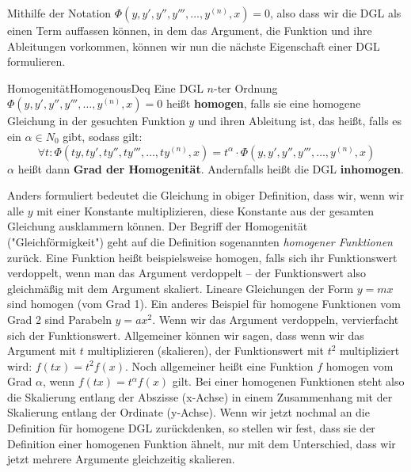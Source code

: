 Mithilfe der Notation $\Phi(y,y',y'',y''',\dots,y^{(n)},x) = 0$, also dass wir die DGL als einen Term auffassen können, in dem das Argument, die Funktion und ihre Ableitungen vorkommen, können wir nun die nächste Eigenschaft einer DGL formulieren.

\begin{definition}{Homogenität}{HomogenousDeq}
    Eine DGL $n$-ter Ordnung $\Phi(y,y',y'',y''',\dots,y^{(n)},x) = 0$ heißt \textbf{homogen}, falls sie eine homogene Gleichung in der gesuchten Funktion $y$ und ihren Ableitung ist, das heißt, falls es ein $\alpha\in N_0$ gibt, sodass gilt:
    $$
        \forall t: \Phi(ty,ty',ty'',ty''',\dots,ty^{(n)},x) = t^\alpha \cdot \Phi(y,y',y'',y''',\dots,y^{(n)},x)
    $$
    $\alpha$ heißt dann \textbf{Grad der Homogenität}. Andernfalls heißt die DGL \textbf{inhomogen}.
\end{definition}

Anders formuliert bedeutet die Gleichung in obiger Definition, dass wir, wenn wir alle $y$ mit einer Konstante multiplizieren, diese Konstante aus der gesamten Gleichung ausklammern können. Der Begriff der Homogenität ("Gleichförmigkeit") geht auf die Definition sogenannten \emph{homogener Funktionen} zurück. Eine Funktion heißt beispielsweise homogen, falls sich ihr Funktionswert verdoppelt, wenn man das Argument verdoppelt -- der Funktionswert also gleichmäßig mit dem Argument skaliert. Lineare Gleichungen der Form $y=mx$ sind homogen (vom Grad 1). Ein anderes Beispiel für homogene Funktionen vom Grad 2 sind Parabeln $y=ax^2$. Wenn wir das Argument verdoppeln, vervierfacht sich der Funktionswert. Allgemeiner können wir sagen, dass wenn wir das Argument mit $t$ multiplizieren (skalieren), der Funktionswert mit $t^2$ multipliziert wird: $f(tx)=t^2f(x)$. Noch allgemeiner heißt eine Funktion $f$ homogen vom Grad $\alpha$, wenn $f(tx) = t^\alpha f(x)$ gilt. Bei einer homogenen Funktionen steht also die Skalierung entlang der Abszisse (x-Achse) in einem Zusammenhang mit der Skalierung entlang der Ordinate (y-Achse). Wenn wir jetzt nochmal an die Definition für homogene DGL zurückdenken, so stellen wir fest, dass sie der Definition einer homogenen Funktion ähnelt, nur mit dem Unterschied, dass wir jetzt mehrere Argumente gleichzeitig skalieren.

